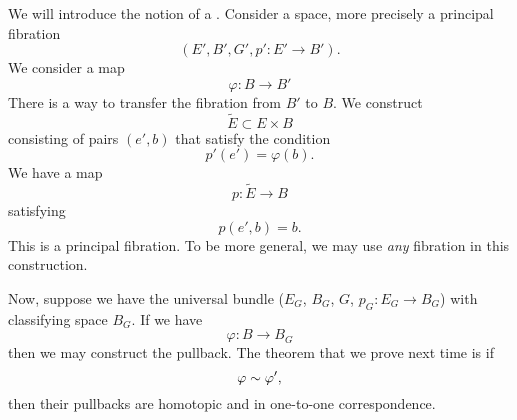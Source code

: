 We will introduce the notion of
a . Consider a
space, more precisely a principal fibration
\begin{equation}
(E',B',G',p'\colon E'\to B').
\end{equation}
We consider a map
\begin{equation}
\varphi\colon B\to B'
\end{equation}
There is a way to transfer the fibration from $B'$ to $B$. We
construct 
\begin{equation}
\widetilde{E}\subset E\times B
\end{equation}
consisting of pairs $(e',b)$ that satisfy the condition
\begin{equation}
p'(e')=\varphi(b).
\end{equation}
We have a map
\begin{equation}
p\colon\widetilde{E}\to B
\end{equation}
satisfying
\begin{equation}
p(e',b)=b.
\end{equation}
This is a principal fibration. To be more general, we may
use \emph{any} fibration in this construction.

Now, suppose we have the universal bundle ($E_{G}$, $B_{G}$, $G$,
$p_{G}\colon E_{G}\to B_{G}$) with classifying space $B_{G}$. If
we have 
\begin{equation}
\varphi\colon B\to B_{G}
\end{equation}
then we may construct the pullback. The theorem that we prove
next time is if 
\begin{equation}
\varphi\sim\varphi',
\end{equation}
then their pullbacks are homotopic and in one-to-one
correspondence.

